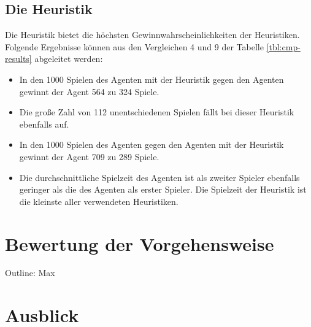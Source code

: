 \subsection{Die Heuristik }
Die  Heuristik bietet die höchsten Gewinnwahrscheinlichkeiten der  Heuristiken. Folgende Ergebnisse können aus den Vergleichen 4 und 9 der Tabelle \ref{tbl:cmp-results} abgeleitet werden:
\begin{itemize}
\item In den 1000 Spielen des  Agenten mit der  Heuristik gegen den  Agenten gewinnt der  Agent 564 zu 324 Spiele.
\item Die große Zahl von 112 unentschiedenen Spielen fällt bei dieser Heuristik ebenfalls auf.
\item In den 1000 Spielen des  Agenten gegen den  Agenten mit der  Heuristik gewinnt der  Agent 709 zu 289 Spiele.
\item Die durchschnittliche Spielzeit des Agenten ist als zweiter Spieler ebenfalls geringer als die des Agenten als erster Spieler. Die Spielzeit der  Heuristik ist die kleinste aller verwendeten Heuristiken.
\end{itemize}

\section{Bewertung der Vorgehensweise}
Outline: Max

\section{Ausblick}
